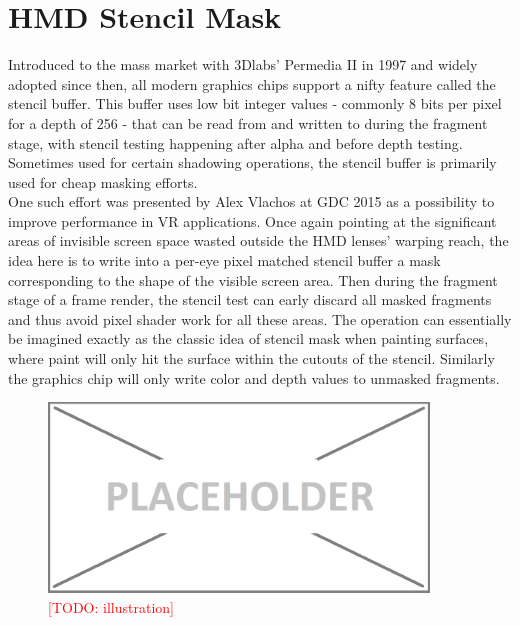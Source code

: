 
\section{HMD Stencil Mask} \label{stencilmask}
Introduced to the mass market with 3Dlabs' Permedia II in 1997 and widely adopted since then, all modern graphics chips support a nifty feature called the stencil buffer. This buffer uses low bit integer values - commonly 8 bits per pixel for a depth of 256 \cite{deVries.2014} - that can be read from and written to during the fragment stage, with stencil testing happening after alpha and before depth testing. Sometimes used for certain shadowing operations, the stencil buffer is primarily used for cheap masking efforts. \\
One such effort was presented by Alex Vlachos at GDC 2015 \cite{Vlachos.2015} as a possibility to improve performance in VR applications. Once again pointing at the significant areas of invisible screen space wasted outside the HMD lenses' warping reach, the idea here is to write into a per-eye pixel matched stencil buffer a mask corresponding to the shape of the visible screen area. Then during the fragment stage of a frame render, the stencil test can early discard all masked fragments and thus avoid pixel shader work for all these areas. The operation can essentially be imagined exactly as the classic idea of stencil mask when painting surfaces, where paint will only hit the surface within the cutouts of the stencil. Similarly the graphics chip will only write color and depth values to unmasked fragments. 

\begin{figure}[htb]
  \centering
  \includegraphics[width=0.9\textwidth]{pictures/placeholder}
  \caption{\textcolor{red}{[TODO: illustration]}} \label{fig:blob}
\end{figure}

